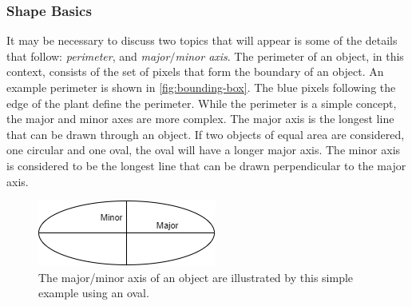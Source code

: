\documentclass[letterpaper, notitlepage]{report}
\begin{document}
{\subsubsection{Shape Basics}
It may be necessary to discuss two topics that will appear is some of the details that follow: \textit{perimeter}, and \textit{major$/$minor axis}. The perimeter of an object, in this context, consists of the set of pixels that form the boundary of an object. An example perimeter is shown in \ref{fig:bounding-box}. The blue pixels following the edge of the plant define the perimeter. While the perimeter is a simple concept, the major and minor axes are more complex. The major axis is the longest line that can be drawn through an object. If two objects of equal area are considered, one circular and one oval, the oval will have a longer major axis. The minor axis is considered to be the longest line that can be drawn perpendicular to the major axis.

\begin{figure}[h!]
	\centering
	\includegraphics[scale=0.5]{./figures/shape-major-minor.png}
	\caption[Major/Minor Axis]{The major/minor axis of an object are illustrated by this simple example using an oval.}
	\label{fig:major-minor}
\end{figure}


}
\end{document}
